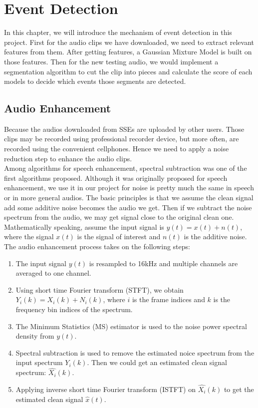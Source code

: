 
\chapter{Event Detection}
In this chapter, we will introduce the mechanism of event detection in this project. 
First for the audio clips we have downloaded, we need to extract relevant features from them. 
After getting features, a Gaussian Mixture Model is built on those features. 
Then for the new testing audio, we would implement a segmentation algorithm to cut the clip into pieces and calculate the score of each models to decide which events those segments are detected.   

\section{Audio Enhancement}
Because the audios downloaded from SSEs are uploaded by other users. 
Those clips may be recorded using professional recorder device, but more often, are recorded using the convenient cellphones. 
Hence we need to apply a noise reduction step to enhance the audio clips. \\ 

Among algorithms for speech enhancement, spectral subtraction was one of the first algorithms proposed. 
Although it was originally proposed for speech enhancement, we use it in our project for noise is pretty much the same in speech or in more general audios. 
The basic principles is that we assume the clean signal add some additive noise becomes the audio we get. 
Then if we subtract the noise spectrum from the audio, we may get signal close to the original clean one. \\  

Mathematically speaking, assume the input signal is $ y(t) = x(t) + n(t)$, where the signal $x(t)$ is the signal of interest and $n(t)$ is the additive noise. 
The audio enhancement process takes on the following steps:
\begin{enumerate}
\item The input signal $y(t)$ is resampled to 16kHz and multiple channels are averaged to one channel. 
\item Using short time Fourier transform (STFT), we obtain $Y_i(k) = X_i(k) + N_i(k)$, where $i$ is the frame indices and $k$ is the frequency bin indices of the spectrum. 
\item The Minimum Statistics (MS) estimator \cite{martin2001noise} is used to the noise power spectral density from $y(t)$. 
\item Spectral subtraction is used to remove the estimated noice spectrum from the input spectrum $Y_i(k)$. 
Then we could get an estimated clean signal spectrum: $\hat{X_i}(k)$. 
\item Applying inverse short time Fourier transform (ISTFT) on $\hat{X_i}(k)$ to get the estimated clean signal $\hat{x}(t)$. 
\end{enumerate}

